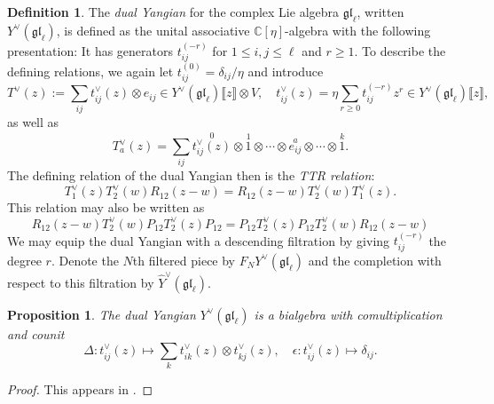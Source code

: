 \documentclass[11pt]{report}
\newtheorem{prop}[theorem]{Proposition}
\theoremstyle{definition}
\newtheorem{definition}[theorem]{Definition}
\theoremstyle{remark}
\theoremstyle{remark}
\newcommand{\C}{\mathbb{C}}
\begin{document}
\begin{definition}
The \emph{dual Yangian} for the complex Lie algebra $\mathfrak{gl}_\ell$, written $Y^\vee(\mathfrak{gl}_\ell)$, is defined as the unital associative $\C[\eta]$-algebra with the following presentation: It has generators $t_{ij}^{(-r)}$ for $1 \leq i,j \leq \ell$ and $r \geq 1$. To describe the defining relations, we again let $t_{ij}^{(0)} = \delta_{ij}/\eta$ and introduce
\begin{equation*}
T^\vee(z) := \sum_{ij} t_{ij}^\vee(z) \otimes e_{ij} \in Y^\vee(\mathfrak{gl}_\ell)\llbracket z \rrbracket \otimes V, \quad t_{ij}^\vee(z) = \eta \sum_{r \geq 0} t_{ij}^{(-r)} z^r \in Y^\vee(\mathfrak{gl}_\ell)\llbracket z \rrbracket,
\end{equation*}
as well as
\begin{equation*}
T_a^\vee(z) = \sum_{ij} \overset{0}{t_{ij}^\vee(z)} \otimes \overset{1}{1} \otimes \cdots \otimes \overset{a}{e_{ij}} \otimes \cdots \otimes \overset{k}{1}.
\end{equation*}
The defining relation of the dual Yangian then is the \emph{TTR relation}:
\begin{equation}\label{equation:TTRRelation}
T_1^\vee(z) T_2^\vee(w) R_{12}(z-w) = R_{12}(z-w) T_2^\vee(w) T_1^\vee(z).
\end{equation}
This relation may also be written as
\begin{equation*}
R_{12}(z-w) T_2^\vee(w) P_{12} T_2^\vee(z) P_{12} = P_{12} T_2^\vee(z) P_{12} T_2^\vee(w) R_{12}(z-w)
\end{equation*}
We may equip the dual Yangian with a descending filtration by giving $t_{ij}^{(-r)}$ the degree $r$. Denote the $N$th filtered piece by $F_N Y^\vee(\mathfrak{gl}_\ell)$ and the completion with respect to this filtration by $\hat Y^\vee(\mathfrak{gl}_\ell)$.
\end{definition}

\begin{prop}
The dual Yangian $Y^\vee(\mathfrak{gl}_\ell)$ is a bialgebra with comultiplication and counit
\begin{equation*}
\Delta: t_{ij}^\vee(z) \mapsto \sum_k t_{ik}^\vee(z) \otimes t_{kj}^\vee(z), \quad \epsilon: t_{ij}^\vee(z) \mapsto \delta_{ij}.
\end{equation*}
\end{prop}

\begin{proof}
This appears in \cite{article:nazarov:2019}.
\end{proof}
\end{document}
